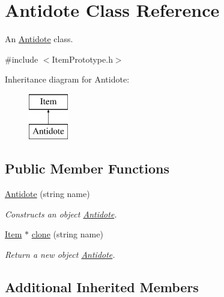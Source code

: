 \hypertarget{class_antidote}{}\section{Antidote Class Reference}
\label{class_antidote}


An \hyperlink{class_antidote}{Antidote} class.  




{\ttfamily \#include $<$Item\+Prototype.\+h$>$}

Inheritance diagram for Antidote\+:\begin{figure}[H]
\begin{center}
\leavevmode
\includegraphics[height=2.000000cm]{class_antidote}
\end{center}
\end{figure}
\subsection*{Public Member Functions}
\begin{DoxyCompactItemize}
\item 
\hypertarget{class_antidote_af9e842ead3c6fbab1147056647ec0ced}{}\hyperlink{class_antidote_af9e842ead3c6fbab1147056647ec0ced}{Antidote} (string name)\label{class_antidote_af9e842ead3c6fbab1147056647ec0ced}

\begin{DoxyCompactList}\small\item\em Constructs an object \hyperlink{class_antidote}{Antidote}. \end{DoxyCompactList}\item 
\hypertarget{class_antidote_af984adccc80a2f49791d6bdfd4918201}{}\hyperlink{class_item}{Item} $\ast$ \hyperlink{class_antidote_af984adccc80a2f49791d6bdfd4918201}{clone} (string name)\label{class_antidote_af984adccc80a2f49791d6bdfd4918201}

\begin{DoxyCompactList}\small\item\em Return a new object \hyperlink{class_antidote}{Antidote}. \end{DoxyCompactList}\end{DoxyCompactItemize}
\subsection*{Additional Inherited Members}


